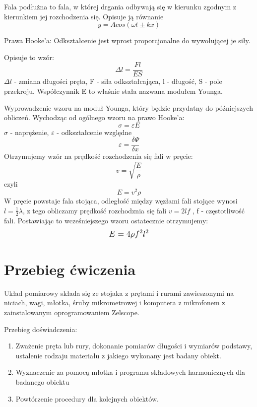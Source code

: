 \documentclass{article}
\begin{document}
 Fala podłużna  to fala, w której drgania odbywają się w kierunku zgodnym z kierunkiem jej rozchodzenia się. 
 Opisuje ją równanie $$ y= Acos(\omega t \pm kx) $$
 
 Prawa Hooke'a: Odkształcenie jest wprost proporcjonalne do wywołującej je siły.
 \newline
 
 Opisuje to wzór: $$ \Delta l = \frac{Fl}{ES} $$
 $\Delta l$ - zmiana długości pręta, F - siła odkształcająca, l - długość, S - pole przekroju. \newline
 Współczynnik E to właśnie stała nazwana modułem Younga.
 
 Wyprowadzenie wzoru na moduł Younga, który będzie przydatny do późniejszych obliczeń.
 \newline
 Wychodząc od ogólnego wzoru na prawo Hooke'a: 
 $$ \sigma = \varepsilon E $$  $\sigma $ - naprężenie, $\varepsilon $ - odkształcenie względne
 $$ \varepsilon = \frac{\delta \Psi}{\delta x} $$
 \newline
Otrzymujemy wzór na  prędkość rozchodzenia się fali w pręcie: 
$$ v = \sqrt{\frac{E}{\rho}} $$
czyli $$ E = v^2\rho $$
\newline
W pręcie powstaje fala stojąca, odległość między węzłami fali stojące wynosi $ l = \frac{1}{2} \lambda $, z tego obliczamy prędkość rozchodznia się fali $ v = 2lf $ , f - częstotliwość fali.
\newline
Postawiając to wcześniejszego wzoru ostatecznie otrzymujemy:
$$\mathlarger{E = 4\rho f^2 l^2}$$
 
 
\section{Przebieg ćwiczenia}

Układ pomiarowy składa się ze stojaka z prętami i rurami zawieszonymi na niciach, wagi, młotka, śruby mikrometrowej i komputera z mikrofonem z zainstalowanym oprogramowaniem Zelscope.

Przebieg doświadczenia:
\begin{enumerate}

    \item Zważenie pręta lub rury, dokonanie pomiarów długości i wymiarów podstawy, ustalenie rodzaju materiału z jakiego wykonany jest badany obiekt.
    \item Wyznaczenie za pomocą młotka i programu składowych harmonicznych dla badanego obiektu
    \item Powtórzenie procedury dla kolejnych obiektów.
     
            
\end{enumerate}
\end{document}
